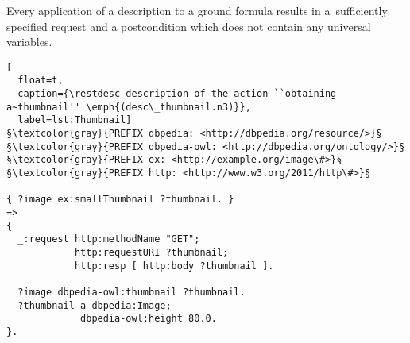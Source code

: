 \begin{corollary}
\label{corollary}
Every application of a \restdesc description to a ground formula results in a~sufficiently specified \http request 
and a postcondition which does not contain any universal variables.
\end{corollary}


\begin{lstlisting}[
  float=t,
  caption={\restdesc description of the action ``obtaining a~thumbnail'' \emph{(desc\_thumbnail.n3)}},
  label=lst:Thumbnail]
§\textcolor{gray}{PREFIX dbpedia: <http://dbpedia.org/resource/>}§
§\textcolor{gray}{PREFIX dbpedia-owl: <http://dbpedia.org/ontology/>}§
§\textcolor{gray}{PREFIX ex: <http://example.org/image\#>}§
§\textcolor{gray}{PREFIX http: <http://www.w3.org/2011/http\#>}§

{ ?image ex:smallThumbnail ?thumbnail. }
=>
{
  _:request http:methodName "GET";
            http:requestURI ?thumbnail;
            http:resp [ http:body ?thumbnail ].

  ?image dbpedia-owl:thumbnail ?thumbnail.
  ?thumbnail a dbpedia:Image;
             dbpedia-owl:height 80.0.
}.
\end{lstlisting}

